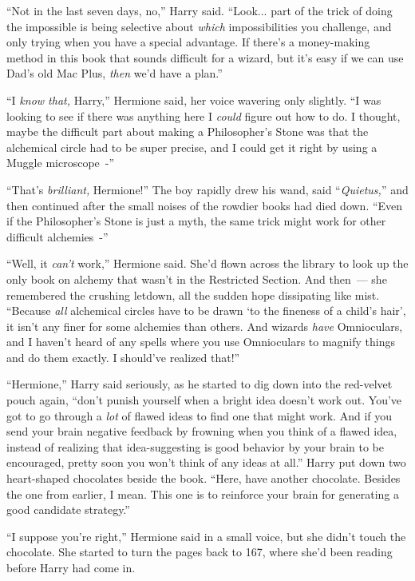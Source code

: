 ``Not in the last seven days, no,'' Harry said. ``Look... part of the trick of doing the impossible is being selective about \emph{which} impossibilities you challenge, and only trying when you have a special advantage. If there's a money-making method in this book that sounds difficult for a wizard, but it's easy if we can use Dad's old Mac Plus, \emph{then} we'd have a plan.''

``I \emph{know that,} Harry,'' Hermione said, her voice wavering only slightly. ``I was looking to see if there was anything here I \emph{could} figure out how to do. I thought, maybe the difficult part about making a Philosopher's Stone was that the alchemical circle had to be super precise, and I could get it right by using a Muggle microscope~-''

``That's \emph{brilliant,} Hermione!'' The boy rapidly drew his wand, said ``\emph{Quietus,}'' and then continued after the small noises of the rowdier books had died down. ``Even if the Philosopher's Stone is just a myth, the same trick might work for other difficult alchemies~-''

``Well, it \emph{can't} work,'' Hermione said. She'd flown across the library to look up the only book on alchemy that wasn't in the Restricted Section. And then~--- she remembered the crushing letdown, all the sudden hope dissipating like mist. ``Because \emph{all} alchemical circles have to be drawn `to the fineness of a child's hair', it isn't any finer for some alchemies than others. And wizards \emph{have} Omnioculars, and I haven't heard of any spells where you use Omnioculars to magnify things and do them exactly. I should've realized that!''

``Hermione,'' Harry said seriously, as he started to dig down into the red-velvet pouch again, ``don't punish yourself when a bright idea doesn't work out. You've got to go through a \emph{lot} of flawed ideas to find one that might work. And if you send your brain negative feedback by frowning when you think of a flawed idea, instead of realizing that idea-suggesting is good behavior by your brain to be encouraged, pretty soon you won't think of any ideas at all.'' Harry put down two heart-shaped chocolates beside the book. ``Here, have another chocolate. Besides the one from earlier, I mean. This one is to reinforce your brain for generating a good candidate strategy.''

``I suppose you're right,'' Hermione said in a small voice, but she didn't touch the chocolate. She started to turn the pages back to 167, where she'd been reading before Harry had come in.

